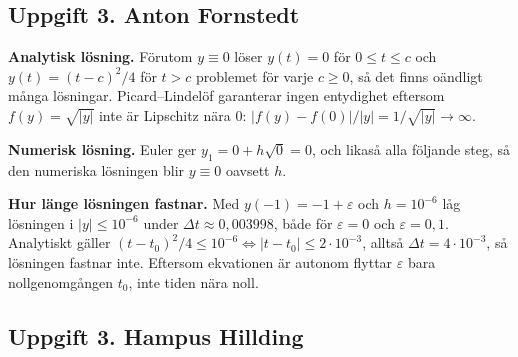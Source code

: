 \documentclass{article}
\begin{document}
\subsection*{Uppgift 3. Anton Fornstedt}

\textbf{Analytisk lösning.} Förutom $y \equiv 0$ löser
$y(t) = 0$ för $0 \leq t \leq c$ och $y(t) = (t-c)^2/4$ för $t > c$
problemet för varje $c \geq 0$, så det finns oändligt många lösningar.
Picard--Lindelöf garanterar ingen entydighet eftersom $f(y) = \sqrt{|y|}$
inte är Lipschitz nära $0$: $|f(y) - f(0)|/|y| = 1/\sqrt{|y|} \to \infty$.

\medskip
\textbf{Numerisk lösning.} Euler ger $y_1 = 0 + h\sqrt{0} = 0$, och likaså
alla följande steg, så den numeriska lösningen blir $y \equiv 0$ oavsett $h$.

\medskip
\textbf{Hur länge lösningen fastnar.} Med $y(-1) = -1 + \varepsilon$ och
$h = 10^{-6}$ låg lösningen i $|y| \leq 10^{-6}$ under $\Delta t \approx 0{,}003998$,
både för $\varepsilon = 0$ och $\varepsilon = 0{,}1$. Analytiskt gäller
$(t - t_0)^2/4 \leq 10^{-6} \iff |t - t_0| \leq 2 \cdot 10^{-3}$, alltså
$\Delta t = 4 \cdot 10^{-3}$, så lösningen fastnar inte. Eftersom ekvationen är
autonom flyttar $\varepsilon$ bara nollgenomgången $t_0$, inte tiden nära noll.

\subsection*{Uppgift 3. Hampus Hillding}
\end{document}
